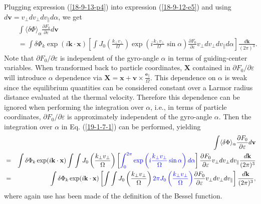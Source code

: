 \documentclass{article}
\newcommand{\tmcolor}[2]{{\color{#1}{#2}}}
\begin{document}
Plugging expression (\ref{18-9-13-p4}) into expression (\ref{18-9-12-e5}) and
using $d\mathbf{v}= v_{\perp} d v_{\perp} d v_{\parallel} d \alpha$, we get
\begin{eqnarray}
  &  & \int \langle \delta \Phi \rangle_{\alpha} \frac{\partial F_0}{\partial
  \varepsilon} d\mathbf{v} \nonumber\\
  &  & = \int \delta \Phi_k \exp (i\mathbf{k} \cdot \mathbf{x}) \left[ \int
  J_0 \left( \frac{k_{\perp} v_{\perp}}{\Omega} \right) \exp \left( i
  \frac{k_{\perp} v_{\perp}}{\Omega} \sin \alpha \right) \frac{\partial
  F_0}{\partial \varepsilon} v_{\perp} d v_{\perp} d v_{\parallel} d \alpha
  \right] \frac{d\mathbf{k}}{(2 \pi)^3} .  \label{19-1-7-1}
\end{eqnarray}
Note that $\partial F_0 / \partial \varepsilon$ is independent of the
gyro-angle $\alpha$ in terms of guiding-center variables. When transformed
back to particle coordinates, $\mathbf{X}$ contained in $\partial F_0 /
\partial \varepsilon$ will introduce $\alpha$ dependence via
$\mathbf{X}=\mathbf{x}+\mathbf{v} \times
\frac{\mathbf{e}_{\parallel}}{\Omega}$. This dependence on $\alpha$ is weak
since the equilibrium quantities can be considered constant over a Larmor
radius distance evaluated at the thermal velocity. Therefore this dependence
can be ignored when performing the integration over $\alpha$, i.e., in terms
of particle coordinates, $\partial F_0 / \partial \varepsilon$ is
approximately independent of the gyro-angle $\alpha$. Then the integration
over $\alpha$ in Eq. (\ref{19-1-7-1}) can be performed, yielding
\begin{eqnarray}
  &  & \int \langle \delta \Phi \rangle_{\alpha} \frac{\partial F_0}{\partial
  \varepsilon} d\mathbf{v} \nonumber\\
  & = & \int \delta \Phi_k \exp (i\mathbf{k} \cdot \mathbf{x}) \int \int J_0
  \left( \frac{k_{\perp} v_{\perp}}{\Omega} \right) \left[
  \tmcolor{blue}{\int_0^{2 \pi} \exp \left( i \frac{k_{\perp}
  v_{\perp}}{\Omega} \sin \alpha \right) d \alpha} \right] \frac{\partial
  F_0}{\partial \varepsilon} v_{\perp} d v_{\perp} d v_{\parallel}
  \frac{d\mathbf{k}}{(2 \pi)^3} \nonumber\\
  & = & \int \delta \Phi_k \exp (i\mathbf{k} \cdot \mathbf{x}) \left[ \int
  \int J_0 \left( \frac{k_{\perp} v_{\perp}}{\Omega} \right) \tmcolor{blue}{2
  \pi J_0 \left( \frac{k_{\perp} v_{\perp}}{\Omega} \right)} \frac{\partial
  F_0}{\partial \varepsilon} v_{\perp} d v_{\perp} d v_{\parallel} \right]
  \frac{d\mathbf{k}}{(2 \pi)^3},  \label{18-9-13-a4}
\end{eqnarray}
where again use has been made of the definition of the Bessel function.
\end{document}
